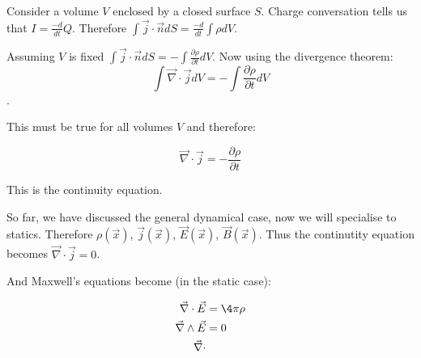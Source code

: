 Consider a volume $V$ enclosed by a closed surface $S$. Charge conversation tells us that $I = \frac{-d}{dt} Q$. Therefore $\int \vec{j} \cdot \vec{n} dS = \frac{-d}{dt} \int \rho dV$.

Assuming $V$ is fixed $\int \vec{j} \cdot \vec{n} dS = - \int \frac{\partial \rho}{\partial t} dV$. Now using the divergence theorem: $$\int \vec{\nabla} \cdot \vec{j} dV = - \int \frac{\partial \rho}{\partial t} dV$$.

This must be true for all volumes $V$ and therefore:

$$\vec{\nabla} \cdot \vec{j} = - \frac{\partial \rho}{\partial t}$$

This is the continuity equation.

So far, we have discussed the general dynamical case, now we will specialise to statics. Therefore $\rho(\vec{x})$, $\vec{j} (\vec{x})$, $\vec{E} (\vec{x})$, $\vec{B} (\vec{x})$. Thus the continutity equation becomes $\vec{\nabla} \cdot \vec{j} = 0$.

And Maxwell's equations become (in the static case):

\begin{align*}

\vec{\nabla} \cdot \vec{E} &= \4 \pi \rho \\
\vec{\nabla} \wedge \vec{E} &= 0 \\
\vec{\nabla} \cdot

\end{align*}

